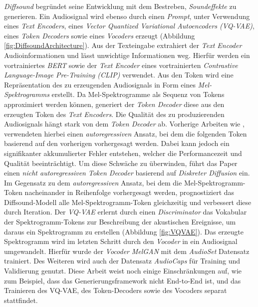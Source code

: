 \documentclass[
  a4paper,  %
  twoside,  %
  bibliography=totoc,
  headsepline,
  cleardoublepage=empty,
  parskip=half,
  draft=false
]{scrbook}
\begin{document}
\emph{Diffsound} \cite{yang_diffsound_2023} begründet seine Entwicklung mit dem Bestreben, \emph{Soundeffekte} zu generieren. Ein Audiosignal wird ebenso durch einen \emph{Prompt}, unter Verwendung eines \emph{Text Encoders}, eines \emph{Vector Quantized Variational Autoencoders (VQ-VAE)}, eines \emph{Token Decoders} sowie eines \emph{Vocoders} erzeugt (Abbildung \ref{fig:DiffsoundArchitecture}). Aus der Texteingabe extrahiert der \emph{Text Encoder} Audioinformationen und lässt unwichtige Informationen weg. Hierfür werden ein vortrainiertes \emph{BERT}\cite{devlin_bert_2019} sowie der \emph{Text Encoder} eines vortrainierten \emph{Contrastive Language-Image Pre-Training (CLIP)}\cite{radford_learning_2021} verwendet. Aus den Token wird eine Repräsentation des zu erzeugenden Audiosignals in Form eines \emph{Mel-Spektrogramms} erstellt. Da Mel-Spektrogramme als Sequenz von Tokens approximiert werden können, generiert der \emph{Token Decoder} diese aus den erzeugten Token des \emph{Text Encoders}. Die Qualität des zu produzierenden Audiosignals hängt stark von dem \emph{Token Decoder} ab. Vorherige Arbeiten wie \cite{liu_conditional_2021}, \cite{iashin_taming_2021} verwendeten hierbei einen \emph{autoregressiven} Ansatz, bei dem die folgenden Token basierend auf den vorherigen vorhergesagt werden. Dabei kann jedoch ein signifikanter akkumulierter Fehler entstehen, welcher die Performancezeit und Qualität beeinträchtigt. Um diese Schwäche zu überwinden, führt das Paper einen \emph{nicht autoregressiven Token Decoder} basierend auf \emph{Diskreter Diffusion}\cite{sohl-dickstein_deep_2015, austin_structured_2023} ein. Im Gegensatz zu dem \emph{autoregressiven} Ansatz, bei dem die Mel-Spektrogramm-Token nacheinander in Reihenfolge vorhergesagt werden, prognostiziert das Diffsound-Modell alle Mel-Spektrogramm-Token gleichzeitig und verbessert diese durch Iteration. Der \emph{VQ-VAE}\cite{oord_neural_2018} erlernt durch einen \emph{Discriminator} das Vokabular der Spektrogramm-Tokens zur Beschreibung der akustischen Ereignisse, um daraus ein Spektrogramm zu erstellen (Abbildung \ref{fig:VQVAE}). Das erzeugte Spektrogramm wird im letzten Schritt durch den \emph{Vocoder} in ein Audiosignal umgewandelt. Hierfür wurde der \emph{Vocoder} \emph{MelGAN} \cite{kumar_melgan_2019} mit dem \emph{AudioSet}\cite{gemmeke_audio_2017} Datensatz trainiert. Des Weiteren wird auch der Datensatz \emph{AudioCaps}\cite{kim_audiocaps_2019} für Training und Validierung genutzt. Diese Arbeit weist noch einige Einschränkungen auf, wie zum Beispiel, dass das Generierungsframework nicht End-to-End ist, und das Trainieren des VQ-VAE, des Token-Decoders sowie des Vocoders separat stattfindet. \cite{yang_diffsound_2023}
\end{document}
